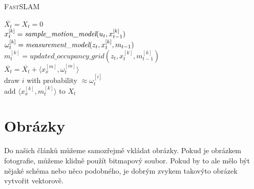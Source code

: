 \documentclass[a4paper, 11pt]{article}
\begin{document}
\begin{algorithm} \label{alg}
    \SetNlSty{}{}{:\enspace}
    \SetAlgoNoLine
    \SetNlSkip{-12pt}
    \caption{\textsc{FastSLAM}}
    \Indp
    \BlankLine
    $\overline{X_t} = X_t = 0$ \\
     {
        \Indpp
        $x_t^{[k]} = \emph{sample\_motion\_model}(u_t, x_{t-1}^{[k]})$ \\
        $\omega_t^{[k]} = \emph{measurement\_model}(z_t, x_t^{[k]}, m_{t-1})$ \\
        $m_t^{[k]} = updated\_occupancy\_grid(z_t, x_t^{[k]}, m_{t-1}^{[k]})$ \\
		$\overline{X_t} = \overline{X_t} + \langle x_x^{[m]}, \omega_t^{[m]} \rangle$ \\
    }
     {
        \Indpp
		draw $i$ with probability $\approx \omega_t^{[i]}$ \\
		add $\langle x_x^{[k]}, m_t^{[k]} \rangle$ to $X_t$ \\
    }
\end{algorithm}

\section{Obrázky}

Do našich článků můžeme samozřejmě vkládat obrázky. Pokud je obrázkem fotografie, můžeme klidně použít
bitmapový soubor. Pokud by to ale mělo být nějaké schéma nebo něco podobného, je dobrým zvykem takovýto
obrázek vytvořit vektorově.
\end{document}
